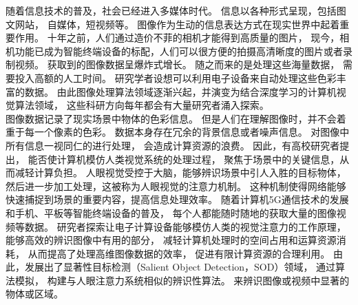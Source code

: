\label{chap:part1}
随着信息技术的普及，社会已经进入多媒体时代。
信息以各种形式呈现，包括图文网站，
自媒体，短视频等。
图像作为生动的信息表达方式在现实世界中起着重要作用。
十年之前，人们通过造价不菲的相机才能得到高质量的图片，
现今，相机功能已成为智能终端设备的标配，人们可以很方便的拍摄高清晰度的图片或者录制视频。
获取到的图像数据呈爆炸式增长。
%
随之而来的是处理这些海量数据，
需要投入高额的人工时间。
研究学者设想可以利用电子设备来自动处理这些色彩丰富的数据。
由此图像处理算法领域逐渐兴起，并演变为结合深度学习的计算机视觉算法领域，
这些科研方向每年都会有大量研究者涌入探索。
\\
%
%
%
%
\indent
图像数据记录了现实场景中物体的色彩信息。
但是人们在理解图像时，并不会着重于每一个像素的色彩。
数据本身存在冗余的背景信息或者噪声信息。
对图像中所有信息一视同仁的进行处理，
会造成计算资源的浪费。
因此，有高校研究者提出，
能否使计算机模仿人类视觉系统的处理过程，
聚焦于场景中的关键信息，从而减轻计算负担。
人眼视觉受控于大脑，能够辨识场景中引人入胜的目标物体，
然后进一步加工处理，这被称为人眼视觉的注意力机制。
这种机制使得网络能够快速捕捉到场景的重要内容，提高信息处理效率。
随着计算机5G通信技术的发展和手机、平板等智能终端设备的普及，
每个人都能随时随地的获取大量的图像视频等数据。
研究者探索让电子计算设备能够模仿人类的视觉注意力的工作原理，
能够高效的辨识图像中有用的部分，
减轻计算机处理时的空间占用和运算资源消耗，
从而提高了处理高维图像数据的效率，
促进有限计算资源的合理利用。
由此，发展出了显著性目标检测（Salient Object Detection，SOD）领域，
通过算法模拟，
构建与人眼注意力系统相似的辨识性算法。
来辨识图像或视频中显著的物体或区域。
\\
%
%
%
%
\indent
%
%
%
